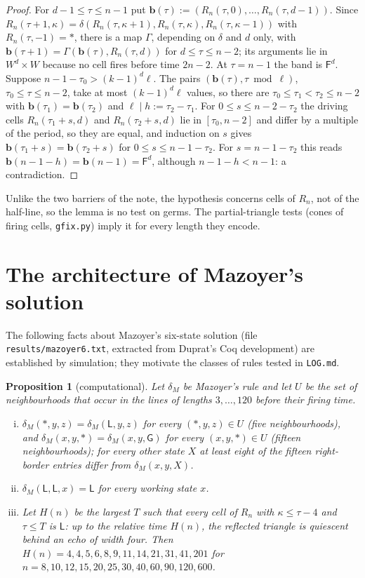 \documentclass[11pt]{article}
\newtheorem{proposition}[theorem]{Proposition}
\theoremstyle{definition}
\theoremstyle{remark}
\newcommand{\Lq}{\mathsf L}
\newcommand{\Gq}{\mathsf G}
\newcommand{\Fq}{\mathsf F}
\begin{document}
\begin{proof}
For $d-1\le\tau\le n-1$ put $\mathbf b(\tau):=(R_n(\tau,0),\dots,R_n(\tau,d-1))$.
Since $R_n(\tau+1,\kappa)=\delta(R_n(\tau,\kappa+1),R_n(\tau,\kappa),
R_n(\tau,\kappa-1))$ with $R_n(\tau,-1)=\ast$, there is a map $\Gamma$, depending
on $\delta$ and $d$ only, with
$\mathbf b(\tau+1)=\Gamma(\mathbf b(\tau),R_n(\tau,d))$ for $d\le\tau\le n-2$; its
arguments lie in $W^d\times W$ because no cell fires before time $2n-2$. At
$\tau=n-1$ the band is $\Fq^d$. Suppose $n-1-\tau_0>(k-1)^d\ell$. The pairs
$(\mathbf b(\tau),\tau\bmod\ell)$, $\tau_0\le\tau\le n-2$, take at most
$(k-1)^d\ell$ values, so there are $\tau_0\le\tau_1<\tau_2\le n-2$ with
$\mathbf b(\tau_1)=\mathbf b(\tau_2)$ and $\ell\mid h:=\tau_2-\tau_1$. For
$0\le s\le n-2-\tau_2$ the driving cells $R_n(\tau_1+s,d)$ and $R_n(\tau_2+s,d)$
lie in $[\tau_0,n-2]$ and differ by a multiple of the period, so they are
equal, and induction on $s$ gives
$\mathbf b(\tau_1+s)=\mathbf b(\tau_2+s)$ for $0\le s\le n-1-\tau_2$. For
$s=n-1-\tau_2$ this reads $\mathbf b(n-1-h)=\mathbf b(n-1)=\Fq^d$, although
$n-1-h<n-1$: a contradiction.
\end{proof}

Unlike the two barriers of the note, the hypothesis concerns cells of $R_n$, not
of the half-line, so the lemma is no test on germs. The partial-triangle tests
(cones of firing cells, \texttt{gfix.py}) imply it for every length they
encode.

\section{The architecture of Mazoyer's solution}\label{sec:mazoyer}

The following facts about Mazoyer's six-state solution (file
\texttt{results/mazoyer6.txt}, extracted from Duprat's Coq development) are
established by simulation; they motivate the classes of rules tested in
\texttt{LOG.md}.

\begin{proposition}[computational]\label{prop:mazoyer}
Let $\delta_M$ be Mazoyer's rule and let $U$ be the set of neighbourhoods that
occur in the lines of lengths $3,\dots,120$ before their firing time.
\begin{enumerate}[(i)]
\item $\delta_M(\ast,y,z)=\delta_M(\Lq,y,z)$ for every $(\ast,y,z)\in U$ (five
neighbourhoods), and $\delta_M(x,y,\ast)=\delta_M(x,y,\Gq)$ for every
$(x,y,\ast)\in U$ (fifteen neighbourhoods); for every other state $X$ at least
eight of the fifteen right-border entries differ from $\delta_M(x,y,X)$.
\item $\delta_M(\Lq,\Lq,x)=\Lq$ for every working state $x$.
\item Let $H(n)$ be the largest $T$ such that every cell of $R_n$ with
$\kappa\le\tau-4$ and $\tau\le T$ is $\Lq$: up to the relative time $H(n)$, the
reflected triangle is quiescent behind an echo of width four. Then
$H(n)=4,4,5,6,8,9,11,14,21,31,41,201$ for
$n=8,10,12,15,20,25,30,40,60,90,120,600$.
\end{enumerate}
\end{proposition}
\end{document}
